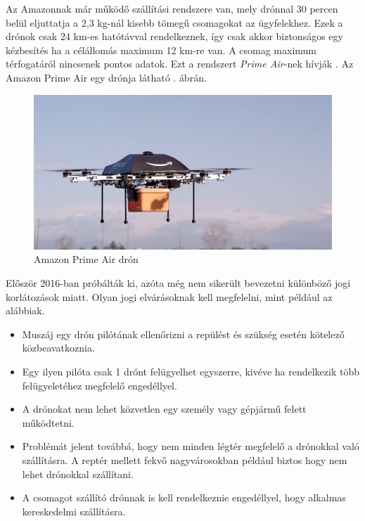 

Az Amazonnak már működő szállítási rendszere van, mely drónnal 30 percen belül eljuttatja a 2,3 kg-nál kisebb tömegű csomagokat az ügyfelekhez.
Ezek a drónok csak 24 km-es hatótávval rendelkeznek, így csak akkor biztonságos egy kézbesítés ha a célállomás maximum 12 km-re van.
A csomag maximum térfogatáról nincsenek pontos adatok.
Ezt a rendszert \textit{Prime Air}-nek hívják \cite{prime-air}. Az Amazon Prime Air egy drónja látható . ábrán.

\begin{figure}[h]
    \centering
    \includegraphics[scale=0.4]{images/prime.jpg}
    \caption{Amazon Prime Air drón}
    \label{fig:prime}
\end{figure}

Először 2016-ban próbálták ki, azóta még nem sikerült bevezetni különböző jogi korlátozások miatt. Olyan jogi elvárásoknak \cite{drone-approval-legal-reasons} kell megfelelni, mint például az alábbiak.
\begin{itemize}
    \item Muszáj egy drón pilótának ellenőrizni a repülést és szükség esetén kötelező közbeavatkoznia.
    \item Egy ilyen pilóta csak 1 drónt felügyelhet egyszerre, kivéve ha rendelkezik több felügyeletéhez megfelelő engedéllyel.
    \item A drónokat nem lehet közvetlen egy személy vagy gépjármű felett működtetni.
    \item Problémát jelent továbbá, hogy nem minden légtér megfelelő a drónokkal való szállításra. A reptér mellett fekvő nagyvárosokban például biztos hogy nem lehet drónokkal szállítani.
    \item A csomagot szállító drónnak is kell rendelkeznie engedéllyel, hogy alkalmas kereskedelmi szállításra.
\end{itemize}

